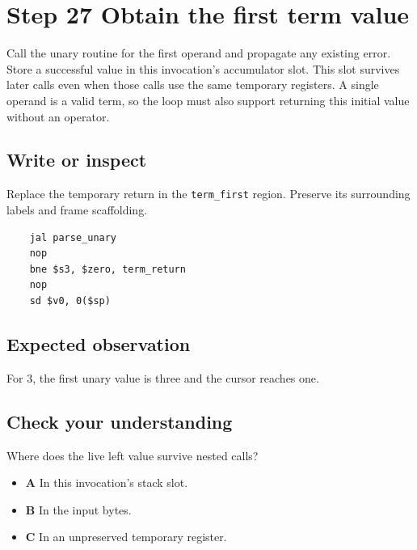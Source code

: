\section{Step 27 Obtain the first term value}\label{expression-s27}

Call the unary routine for the first operand and propagate any existing error. Store a successful value in this invocation's accumulator slot. This slot survives later calls even when those calls use the same temporary registers. A single operand is a valid term, so the loop must also support returning this initial value without an operator.

\subsection{Write or inspect}
Replace the temporary return in the \texttt{term\_first} region. Preserve its surrounding labels and frame scaffolding.

\begin{verbatim}
    jal parse_unary
    nop
    bne $s3, $zero, term_return
    nop
    sd $v0, 0($sp)
\end{verbatim}
\subsection{Expected observation}
For 3, the first unary value is three and the cursor reaches one.

\subsection{Check your understanding}
Where does the live left value survive nested calls?

\begin{itemize}
  \item \textbf{A} In this invocation's stack slot.
  \item \textbf{B} In the input bytes.
  \item \textbf{C} In an unpreserved temporary register.
\end{itemize}
